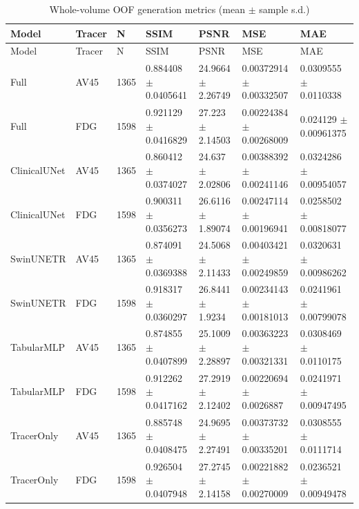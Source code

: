 \documentclass{article}
\begin{document}
\begin{landscape}
\begingroup
\footnotesize
\setlength{\tabcolsep}{4pt}
\begin{longtable}{lllllll}
\caption{Whole-volume OOF generation metrics (mean $\pm$ sample s.d.)}\label{tab:whole_volume_generation}\\
\toprule
Model & Tracer & N & SSIM & PSNR & MSE & MAE \\
\midrule
\endfirsthead
\toprule
Model & Tracer & N & SSIM & PSNR & MSE & MAE \\
\midrule
\endhead
\bottomrule
\endfoot
Full & AV45 & 1365 & 0.884408 \(\pm\) 0.0405641 & 24.9664 \(\pm\) 2.26749 & 0.00372914 \(\pm\) 0.00332507 & 0.0309555 \(\pm\) 0.0110338 \\
Full & FDG & 1598 & 0.921129 \(\pm\) 0.0416829 & 27.223 \(\pm\) 2.14503 & 0.00224384 \(\pm\) 0.00268009 & 0.024129 \(\pm\) 0.00961375 \\
ClinicalUNet & AV45 & 1365 & 0.860412 \(\pm\) 0.0374027 & 24.637 \(\pm\) 2.02806 & 0.00388392 \(\pm\) 0.00241146 & 0.0324286 \(\pm\) 0.00954057 \\
ClinicalUNet & FDG & 1598 & 0.900311 \(\pm\) 0.0356273 & 26.6116 \(\pm\) 1.89074 & 0.00247114 \(\pm\) 0.00196941 & 0.0258502 \(\pm\) 0.00818077 \\
SwinUNETR & AV45 & 1365 & 0.874091 \(\pm\) 0.0369388 & 24.5068 \(\pm\) 2.11433 & 0.00403421 \(\pm\) 0.00249859 & 0.0320631 \(\pm\) 0.00986262 \\
SwinUNETR & FDG & 1598 & 0.918317 \(\pm\) 0.0360297 & 26.8441 \(\pm\) 1.9234 & 0.00234143 \(\pm\) 0.00181013 & 0.0241961 \(\pm\) 0.00799078 \\
TabularMLP & AV45 & 1365 & 0.874855 \(\pm\) 0.0407899 & 25.1009 \(\pm\) 2.28897 & 0.00363223 \(\pm\) 0.00321331 & 0.0308469 \(\pm\) 0.0110175 \\
TabularMLP & FDG & 1598 & 0.912262 \(\pm\) 0.0417162 & 27.2919 \(\pm\) 2.12402 & 0.00220694 \(\pm\) 0.0026887 & 0.0241971 \(\pm\) 0.00947495 \\
TracerOnly & AV45 & 1365 & 0.885748 \(\pm\) 0.0408475 & 24.9695 \(\pm\) 2.27491 & 0.00373732 \(\pm\) 0.00335201 & 0.0308555 \(\pm\) 0.0111714 \\
TracerOnly & FDG & 1598 & 0.926504 \(\pm\) 0.0407948 & 27.2745 \(\pm\) 2.14158 & 0.00221882 \(\pm\) 0.00270009 & 0.0236521 \(\pm\) 0.00949478 \\

\end{longtable}
\end{landscape}
\end{document}

